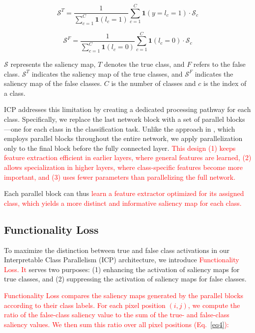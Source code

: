 \documentclass[preprint,7pt, a4paper]{elsarticle}
\begin{document}
\begin{equation}
    \mathcal{S}^T = \frac{1}{\sum_{c=1}^C \bm{1}(l_c=1)} \sum_{c=1}^C \bm{1} (y=l_c = 1) \cdot \mathcal{S}_c
    \label{eq5}
\end{equation}

\begin{equation}
    \mathcal{S}^F = \frac{1}{\sum_{c=1}^C \bm{1}(l_c=0)} \sum_{c=1}^C \bm{1} (l_c = 0) \cdot \mathcal{S}_c
    \label{eq6}
\end{equation}

$\mathcal{S}$ represents the saliency map, $T$ denotes the true class, and $F$ refers to the false class. $\mathcal{S}^T$ indicates the saliency map of the true classes, and $\mathcal{S}^F$ indicates the saliency map of the false classes. $C$ is the number of classes and $c$ is the index of a class.

ICP addresses this limitation by creating a dedicated processing pathway for each class. Specifically, we replace the last network block with a set of parallel blocks—one for each class in the classification task. Unlike the approach in \cite{44}, which employs parallel blocks throughout the entire network, we apply parallelization only to the final block before the fully connected layer. \textcolor{red}{This design (1) keeps feature extraction efficient in earlier layers, where general features are learned, (2) allows specialization in higher layers, where class-specific features become more important, and (3) uses fewer parameters than parallelizing the full network.}

Each parallel block can thus \textcolor{red}{learn a feature extractor optimized for its assigned class, which yields a more distinct and informative saliency map for each class.}



\subsection{Functionality Loss}
\label{m2}

To maximize the distinction between true and false class activations in our Interpretable Class Parallelism (ICP) architecture, we introduce \textcolor{red}{Functionality Loss. It} serves two purposes: (1) enhancing the activation of saliency maps for true classes, and (2) suppressing the activation of saliency maps for false classes.

\textcolor{red}{Functionality Loss compares the saliency maps generated by the parallel blocks according to their class labels. For each pixel position $(i, j)$, we compute the ratio of the false-class saliency value to the sum of the true- and false-class saliency values. We then sum this ratio over all pixel positions (Eq.~\ref{eq4}):}
\end{document}
